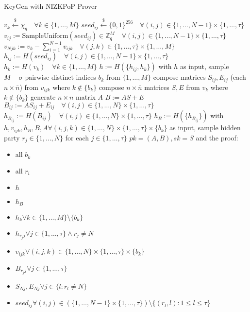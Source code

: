 \documentclass[11pt,a4paper]{article}
\begin{document}
	\begin{algorithm}[H]
	\centering
	\caption{KeyGen with NIZKPoP Prover}\label{keygen}
	\begin{algorithmic}[1]
		\State $v_k\overset{\$}{\leftarrow}\chi_q \quad\forall k\in\{1,\ldots,M\}$
		\State $seed_{ij}\overset{\$}{\leftarrow}\{0,1\}^{256}\quad\forall (i,j)\in\{1,\ldots,N-1\}\times\{1,\ldots,\tau\}$
		\State $v_{ij}:=\text{SampleUniform}(seed_{ij})\in\mathbb{Z}_q^M\quad\forall (i,j)\in\{1,\ldots,N-1\}\times\{1,\ldots,\tau\}$ 
		\State $v_{Njk}:=v_k-\sum_{i=1}^{N-1}v_{ijk}\quad\forall (j,k)\in\{1,\ldots,\tau\}\times\{1,\ldots,M\}$
		\State $h_{ij}:=H(seed_{ij})\quad\forall(i,j)\in\{1,\ldots,N-1\}\times\{1,\ldots,\tau\}$ 
		\State $h_{k}:=H(v_k)\quad\forall k\in\{1,\ldots,M\}$
		\State $h:=H(\{h_{ij},h_k\})$
		\State with $h$ as input, sample $M-\sigma$ pairwise distinct indices $b_k$ from $\{1,\ldots,M\}$ 
		\State compose matrices $S_{ij},E_{ij}$ (each $n\times\bar{n}$) from $v_{ijk}$ where $k\not\in\{b_k\}$
		\State compose $n\times\bar{n}$ matrices $S,E$ from $v_k$ where $k\not\in\{b_k\}$ 
		\State generate $n\times n$ matrix $A$
		\State $B:=AS+E$
		\State $B_{ij}:=AS_{ij}+E_{ij}\quad\forall (i,j)\in\{1,\ldots,N\}\times\{1,\ldots,\tau\}$
		\State $h_{B_{ij}}:=H(B_{ij})\quad\forall (i,j)\in\{1,\ldots,N\}\times\{1,\ldots,\tau\}$
		\State $h_B:=H(\{h_{B_{ij}}\})$
		\State with $h,v_{ijk},h_B,B,A\forall(i,j,k)\in\{1,\ldots,N\}\times\{1,\ldots,\tau\}\times\{b_k\}$ as input, sample hidden party $r_j\in\{1,\ldots,N\}$ for each $j\in\{1,\ldots,\tau\}$
		\State \Return $pk=(A,B),sk=S$ and the proof: \begin{itemize}
			\item all $b_k$
			\item all $r_i$
			\item $h$
			\item $h_B$
			\item $h_k \forall k\in \{1,\ldots,M\}\setminus\{b_k\}$
			\item $h_{r_jj}\forall j\in\{1,\ldots,\tau\}\wedge r_j\neq N$
			\item $v_{ijk}\forall(i,j,k)\in\{1,\ldots,N\}\times\{1,\ldots,\tau\}\times\{b_k\}$
			\item $B_{r_jj}\forall j\in\{1,\ldots,\tau\}$
			\item $S_{Nj},E_{Nj}\forall j\in\{l : r_l\neq N\}$
			\item $seed_{ij}\forall(i,j)\in(\{1,\ldots,N-1\}\times\{1,\ldots,\tau\})\setminus\{(r_l,l):1\leq l\leq\tau\}$
		\end{itemize}
	\end{algorithmic}
	\end{algorithm}
\end{document}
